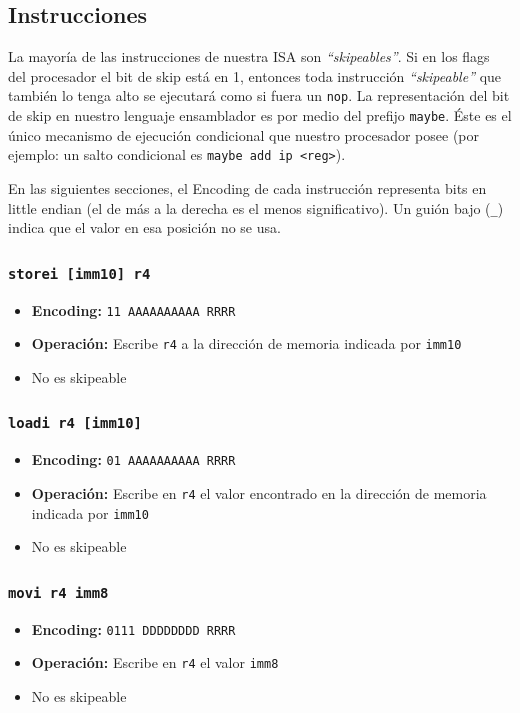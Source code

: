 \documentclass{article}
\begin{document}
\subsection{Instrucciones}

La mayoría de las instrucciones de nuestra ISA son \emph{``skipeables''}. Si en los flags del procesador el bit de skip está en 1, entonces toda instrucción \emph{``skipeable''} que también lo tenga alto se ejecutará como si fuera un \texttt{nop}. La representación del bit de skip en nuestro lenguaje ensamblador es por medio del prefijo \texttt{maybe}. Éste es el único mecanismo de ejecución condicional que nuestro procesador posee (por ejemplo: un salto condicional es \texttt{maybe add ip <reg>}).

En las siguientes secciones, el Encoding de cada instrucción representa bits en little endian (el de más a la derecha es el menos significativo). Un guión bajo (\texttt{\_}) indica que el valor en esa posición no se usa.

\subsubsection{\texttt{storei [imm10] r4}}
\begin{itemize}
    \item \textbf{Encoding:} \texttt{11 AAAAAAAAAA RRRR}
    \item \textbf{Operación:} Escribe \texttt{r4} a la dirección de memoria indicada por \texttt{imm10}
    \item No es skipeable
\end{itemize}

\subsubsection{\texttt{loadi r4 [imm10]}}
\begin{itemize}
    \item \textbf{Encoding:} \texttt{01 AAAAAAAAAA RRRR}
    \item \textbf{Operación:} Escribe en \texttt{r4} el valor encontrado en la dirección de memoria indicada por \texttt{imm10}
    \item No es skipeable
\end{itemize}

\subsubsection{\texttt{movi r4 imm8}}
\begin{itemize}
    \item \textbf{Encoding:} \texttt{0111 DDDDDDDD RRRR}
    \item \textbf{Operación:} Escribe en \texttt{r4} el valor \texttt{imm8}
    \item No es skipeable
\end{itemize}
\end{document}
